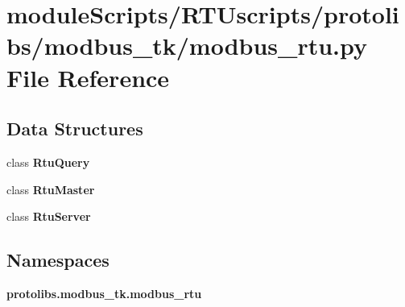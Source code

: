 \section{module\+Scripts/\+R\+T\+Uscripts/protolibs/modbus\+\_\+tk/modbus\+\_\+rtu.py File Reference}
\label{modbus__tk_2modbus__rtu_8py}
\subsection*{Data Structures}
\begin{DoxyCompactItemize}
\item 
class {\bf Rtu\+Query}
\item 
class {\bf Rtu\+Master}
\item 
class {\bf Rtu\+Server}
\end{DoxyCompactItemize}
\subsection*{Namespaces}
\begin{DoxyCompactItemize}
\item 
 {\bf protolibs.\+modbus\+\_\+tk.\+modbus\+\_\+rtu}
\end{DoxyCompactItemize}
